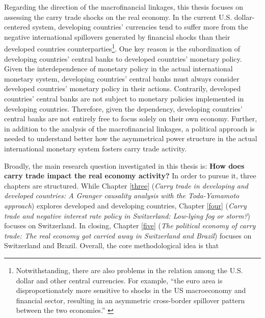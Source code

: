 \documentclass[a4paper, twoside]{templates/ociamthesis}
\begin{document}
Regarding the direction of the macrofinancial linkages, this thesis focuses on assessing the carry trade shocks on the real economy. In the current U.S. dollar-centered system, developing countries' currencies tend to suffer more from the negative international spillovers generated by financial shocks than their developed countries counterparties\footnote{Notwithstanding, there are also problems in the relation among the U.S. dollar and other central currencies. For example, ``the euro area is disproportionately more sensitive to shocks in the US macroeconomy and financial sector, resulting in an asymmetric cross-border spillover pattern between the two economies.'' \autocite[ 5]{gerba2020}}. One key reason is the subordination of developing countries' central banks to developed countries' monetary policy. Given the interdependence of monetary policy in the actual international monetary system, developing countries' central banks must always consider developed countries' monetary policy in their actions. Contrarily, developed countries' central banks are not subject to monetary policies implemented in developing countries. Therefore, given the dependency, developing countries' central banks are not entirely free to focus solely on their own economy. Further, in addition to the analysis of the macrofinancial linkages, a political approach is needed to understand better how the asymmetrical power structure in the actual international monetary system fosters carry trade activity.

Broadly, the main research question investigated in this thesis is: \textbf{How does carry trade impact the real economy activity?} In order to pursue it, three chapters are structured. While Chapter \ref{three} (\emph{Carry trade in developing and developed countries: A Granger causality analysis with the Toda-Yamamoto approach}) explores developed and developing countries, Chapter \ref{four} (\emph{Carry trade and negative interest rate policy in Switzerland: Low-lying fog or storm?}) focuses on Switzerland. In closing, Chapter \ref{five} (\emph{The political economy of carry trade: The real economy got carried away in Switzerland and Brazil}) focuses on Switzerland and Brazil. Overall, the core methodological idea is that
\end{document}
